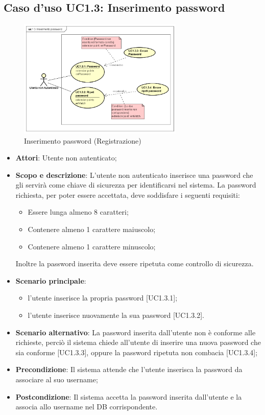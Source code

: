 \documentclass[12pt,a4paper,titlepage]{article}
\begin{document}
	\subsection{Caso d'uso UC1.3: Inserimento password}
	\label{UC1.3}
	\begin{figure}[H]
		\centering
		\includegraphics[width=0.7\textwidth]{UseCase/InserimentoPassword}
		\caption{Inserimento password (Registrazione)}
	\end{figure}
	\begin{itemize}
		\item \textbf{Attori}: Utente non autenticato;
		\item \textbf{Scopo e descrizione}: L'utente non autenticato inserisce una password che gli servirà come chiave di sicurezza per identificarsi nel sistema. La password richiesta, per poter essere accettata, deve soddisfare i seguenti requisiti: 
		\begin{itemize}
			\item Essere lunga almeno 8 caratteri; 
			\item Contenere almeno 1 carattere maiuscolo; 
			\item Contenere almeno 1 carattere minuscolo;
		\end{itemize}
		Inoltre la password inserita deve essere ripetuta come controllo di sicurezza.
		\item \textbf{Scenario principale}:
		\begin{itemize}
			\item l'utente inserisce la propria password [UC1.3.1];
			\item l'utente inserisce nuovamente la sua password [UC1.3.2].
		\end{itemize}
		\item \textbf{Scenario alternativo}: La password inserita dall'utente non è conforme alle richieste, perciò il sistema chiede all'utente di inserire una nuova password che sia conforme [UC1.3.3], oppure la password ripetuta non combacia [UC1.3.4];
		\item \textbf{Precondizione}: Il sistema attende che l'utente inserisca la password da associare al suo username;
		\item \textbf{Postcondizione}: Il sistema accetta la password inserita dall'utente e la associa allo username nel DB corrispondente.
	\end{itemize}
\end{document}
